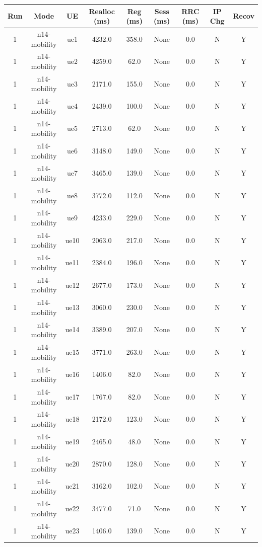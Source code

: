 \begin{table}[ht]
\centering
\begin{tabular}{|c|c|c|c|c|c|c|c|c|}
\hline
Run & Mode & UE & Realloc (ms) & Reg (ms) & Sess (ms) & RRC (ms) & IP Chg & Recov \\
\hline
1 & n14-mobility & ue1 & 4232.0 & 358.0 & None & 0.0 & N & Y \\
1 & n14-mobility & ue2 & 4259.0 & 62.0 & None & 0.0 & N & Y \\
1 & n14-mobility & ue3 & 2171.0 & 155.0 & None & 0.0 & N & Y \\
1 & n14-mobility & ue4 & 2439.0 & 100.0 & None & 0.0 & N & Y \\
1 & n14-mobility & ue5 & 2713.0 & 62.0 & None & 0.0 & N & Y \\
1 & n14-mobility & ue6 & 3148.0 & 149.0 & None & 0.0 & N & Y \\
1 & n14-mobility & ue7 & 3465.0 & 139.0 & None & 0.0 & N & Y \\
1 & n14-mobility & ue8 & 3772.0 & 112.0 & None & 0.0 & N & Y \\
1 & n14-mobility & ue9 & 4233.0 & 229.0 & None & 0.0 & N & Y \\
1 & n14-mobility & ue10 & 2063.0 & 217.0 & None & 0.0 & N & Y \\
1 & n14-mobility & ue11 & 2384.0 & 196.0 & None & 0.0 & N & Y \\
1 & n14-mobility & ue12 & 2677.0 & 173.0 & None & 0.0 & N & Y \\
1 & n14-mobility & ue13 & 3060.0 & 230.0 & None & 0.0 & N & Y \\
1 & n14-mobility & ue14 & 3389.0 & 207.0 & None & 0.0 & N & Y \\
1 & n14-mobility & ue15 & 3771.0 & 263.0 & None & 0.0 & N & Y \\
1 & n14-mobility & ue16 & 1406.0 & 82.0 & None & 0.0 & N & Y \\
1 & n14-mobility & ue17 & 1767.0 & 82.0 & None & 0.0 & N & Y \\
1 & n14-mobility & ue18 & 2172.0 & 123.0 & None & 0.0 & N & Y \\
1 & n14-mobility & ue19 & 2465.0 & 48.0 & None & 0.0 & N & Y \\
1 & n14-mobility & ue20 & 2870.0 & 128.0 & None & 0.0 & N & Y \\
1 & n14-mobility & ue21 & 3162.0 & 102.0 & None & 0.0 & N & Y \\
1 & n14-mobility & ue22 & 3477.0 & 71.0 & None & 0.0 & N & Y \\
1 & n14-mobility & ue23 & 1406.0 & 139.0 & None & 0.0 & N & Y \\

\end{tabular}
\end{table}
